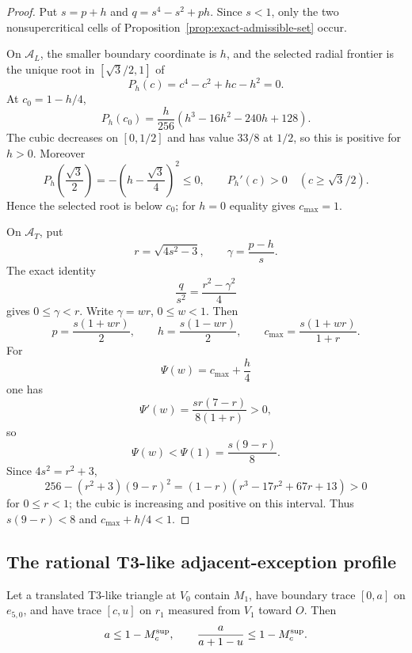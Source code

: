 \begin{proof}
Put $s=p+h$ and $q=s^4-s^2+ph$.  Since $s<1$, only the two
nonsupercritical cells of Proposition~\ref{prop:exact-admissible-set} occur.

On $\mathcal A_L$, the smaller boundary coordinate is $h$, and the selected
radial frontier is the unique root in $[\sqrt3/2,1]$ of
\[
 P_h(c)=c^4-c^2+hc-h^2=0.
\]
At $c_0=1-h/4$,
\[
 P_h(c_0)=\frac h{256}(h^3-16h^2-240h+128).
\]
The cubic decreases on $[0,1/2]$ and has value $33/8$ at $1/2$, so this is
positive for $h>0$.  Moreover
\[
 P_h\left(\frac{\sqrt3}{2}\right)
 =-\left(h-\frac{\sqrt3}{4}\right)^2\le0,
 \qquad
 P_h'(c)>0\quad(c\ge\sqrt3/2).
\]
Hence the selected root is below $c_0$; for $h=0$ equality gives
$c_{\max}=1$.

On $\mathcal A_T$, put
\[
 r=\sqrt{4s^2-3},
 \qquad
 \gamma=\frac{p-h}{s}.
\]
The exact identity
\[
 \frac q{s^2}=\frac{r^2-\gamma^2}{4}
\]
gives $0\le\gamma<r$.  Write $\gamma=wr$, $0\le w<1$.  Then
\[
 p=\frac{s(1+wr)}2,
 \qquad
 h=\frac{s(1-wr)}2,
 \qquad
 c_{\max}=\frac{s(1+wr)}{1+r}.
\]
For
\[
 \Psi(w)=c_{\max}+\frac h4
\]
one has
\[
 \Psi'(w)=\frac{sr(7-r)}{8(1+r)}>0,
\]
so
\[
 \Psi(w)<\Psi(1)=\frac{s(9-r)}8.
\]
Since $4s^2=r^2+3$,
\[
 256-(r^2+3)(9-r)^2
 =(1-r)(r^3-17r^2+67r+13)>0
\]
for $0\le r<1$; the cubic is increasing and positive on this interval.
Thus $s(9-r)<8$ and $c_{\max}+h/4<1$.
\end{proof}

\subsection{The rational T3-like adjacent-exception profile}

\begin{lemma}
\label{lem:short-t3-rescuer-profile}
Let a translated T3-like triangle at $V_0$ contain $M_1$, have boundary trace
$[0,a]$ on $e_{5,0}$, and have trace $[c,u]$ on $r_1$ measured
from $V_1$ toward $O$.  Then
\begin{equation}
 a\le 1-M_c^{\rm sup},
 \qquad
 \frac{a}{a+1-u}\le 1-M_c^{\rm sup}.
 \label{eq:short-t3-profile}
\end{equation}
\end{lemma}

